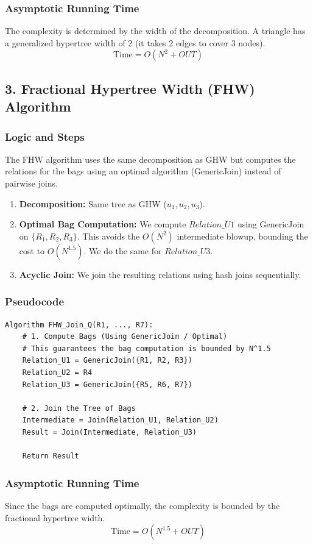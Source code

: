 \documentclass[11pt]{article}
\begin{document}
\subsubsection*{Asymptotic Running Time}
The complexity is determined by the width of the decomposition. A triangle has a generalized hypertree width of 2 (it takes 2 edges to cover 3 nodes).
\[ \text{Time} = O(N^2 + OUT) \]

\subsection*{3. Fractional Hypertree Width (FHW) Algorithm}

\subsubsection*{Logic and Steps}
The FHW algorithm uses the same decomposition as GHW but computes the relations for the bags using an optimal algorithm (GenericJoin) instead of pairwise joins.
\begin{enumerate}
    \item \textbf{Decomposition:} Same tree as GHW ($u_1, u_2, u_3$).
    \item \textbf{Optimal Bag Computation:} We compute $Relation\_U1$ using GenericJoin on $\{R_1, R_2, R_3\}$. This avoids the $O(N^2)$ intermediate blowup, bounding the cost to $O(N^{1.5})$. We do the same for $Relation\_U3$.
    \item \textbf{Acyclic Join:} We join the resulting relations using hash joins sequentially.
\end{enumerate}

\subsubsection*{Pseudocode}
\begin{verbatim}
Algorithm FHW_Join_Q(R1, ..., R7):
    # 1. Compute Bags (Using GenericJoin / Optimal)
    # This guarantees the bag computation is bounded by N^1.5
    Relation_U1 = GenericJoin({R1, R2, R3})
    Relation_U2 = R4
    Relation_U3 = GenericJoin({R5, R6, R7})
    
    # 2. Join the Tree of Bags
    Intermediate = Join(Relation_U1, Relation_U2)
    Result = Join(Intermediate, Relation_U3)
    
    Return Result
\end{verbatim}

\subsubsection*{Asymptotic Running Time}
Since the bags are computed optimally, the complexity is bounded by the fractional hypertree width.
\[ \text{Time} = O(N^{1.5} + OUT) \]
\end{document}
